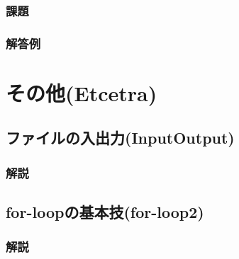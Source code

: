 \documentclass[10pt,a4j]{jbook}
\begin{document}
\subsection{課題}
 
\subsection{解答例}
 

\chapter{その他(Etcetra)}
\section{ファイルの入出力(InputOutput)}
\subsection{解説}

\section{for-loopの基本技(for-loop2)}
\subsection{解説}

\end{document}
